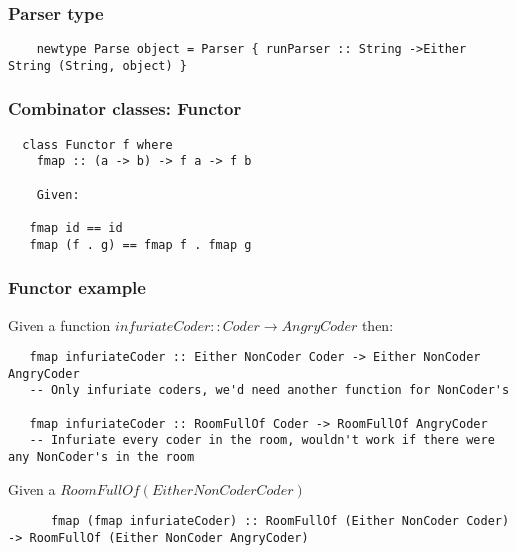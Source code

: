 \documentclass{beamer}
\begin{document}
\begin{frame}
  \frametitle{Parser type}

  \begin{lstlisting}
    newtype Parse object = Parser { runParser :: String ->Either String (String, object) }
  \end{lstlisting}

\end{frame}


\begin{frame}
  \frametitle{Combinator classes: Functor}

  \begin{lstlisting}
  class Functor f where
    fmap :: (a -> b) -> f a -> f b

    Given:

   fmap id == id
   fmap (f . g) == fmap f . fmap g
  \end{lstlisting}
\end{frame}


%
%


\begin{frame}
  \frametitle{Functor example}

  Given a function $infuriateCoder :: Coder \to AngryCoder$ then:
  \begin{lstlisting}
   fmap infuriateCoder :: Either NonCoder Coder -> Either NonCoder AngryCoder
   -- Only infuriate coders, we'd need another function for NonCoder's

   fmap infuriateCoder :: RoomFullOf Coder -> RoomFullOf AngryCoder
   -- Infuriate every coder in the room, wouldn't work if there were any NonCoder's in the room
  \end{lstlisting}


  Given a $RoomFullOf (Either NonCoder Coder)$
    \begin{lstlisting}
      fmap (fmap infuriateCoder) :: RoomFullOf (Either NonCoder Coder) -> RoomFullOf (Either NonCoder AngryCoder)
    \end{lstlisting}

\end{frame}
\end{document}
